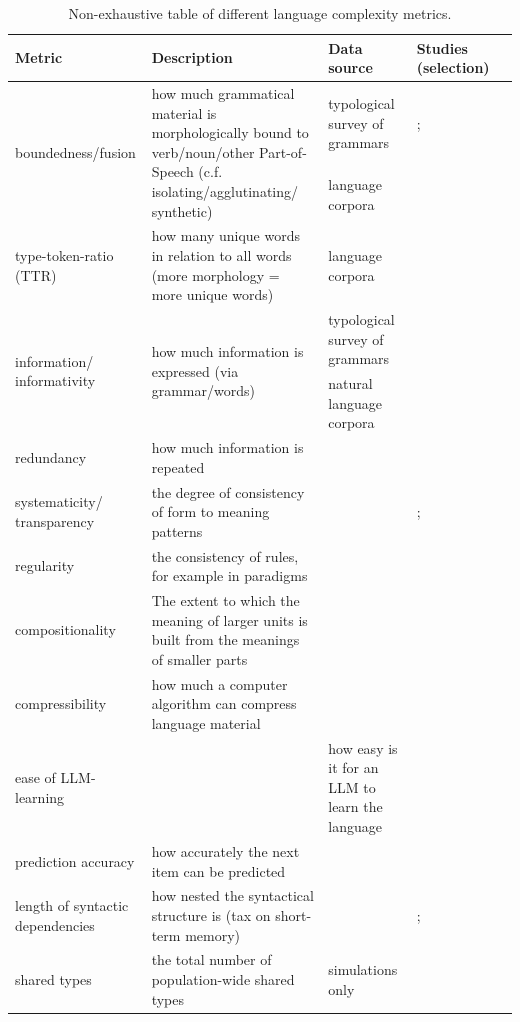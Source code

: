 \documentclass[a4paper]{article}
\begin{document}
\begin{table}[h]
    \centering
    \begin{tabular}{p{3cm}p{5cm}p{2.5cm}p{3cm}p{2cm}}  %
        \toprule
        \textbf{Metric} & \textbf{Description} & \textbf{Data source} & \textbf{Studies (selection)} \\ 
        \midrule
       \multirow{2}{3cm}{boundedness/fusion}   & \multirow{2}{5cm}{how much grammatical material is morphologically bound to verb/noun/other Part-of-Speech (c.f. isolating/agglutinating/ synthetic) } & typological survey of grammars & \cite{grambank_release}; \cite{shcherbakova2023societies} \\ 
        \cmidrule{3-4}
         &  & language corpora \\ 
         \midrule
        type-token-ratio (TTR) & how many unique words in relation to all words (more morphology = more unique words) & language corpora &  \cite{kettunen2014can}\\ 
               \midrule
     \multirow{2}{3cm}{information/ informativity}     & \multirow{2}{5cm}{how much information is expressed (via grammar/words)} & typological survey of grammars & \cite{shcherbakova2023societies} \\
       \cmidrule{3-4}
      &  & natural language corpora \\    \midrule
redundancy  & how much information is repeated &&  \cite{leufkens2023measuring}\\    \midrule
systematicity/ transparency  & the degree of consistency of form to meaning patterns && \cite{raviv2019larger}; \cite{hengeveld2018transparent} \\    \midrule
regularity & the consistency of rules, for example in paradigms & & \cite{round2022cognition}\\    \midrule
compositionality  & The extent to which the meaning of larger units is built from the meanings of smaller parts &  &\cite{wray2007consequences} \\    \midrule
compressibility  & how much a computer algorithm can compress language material & & \cite{juola1998measuring} \\    \midrule
ease of LLM-learning  & &how easy is it for an LLM to learn the language & \cite{koplenig2023languages}  \\    \midrule

prediction accuracy  & how accurately the next item can be predicted && \cite{frank2011insensitivity} \\    \midrule
length of syntactic dependencies  &  how nested the syntactical structure is (tax on short-term memory) && \cite{gibson1998linguistic}; \citet{liu2008dependency} \\    
\midrule
shared types & the total number of population-wide shared types & simulations only & \citet{spike2017population}\\
\bottomrule
    \end{tabular}
    \caption{Non-exhaustive table of different language complexity metrics.}
    \label{tab:complex_metrics}
\end{table}
\end{document}
